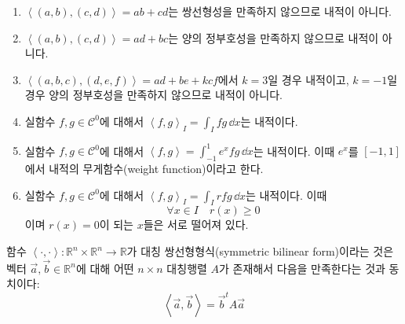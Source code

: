 \documentclass[../engineering_mathematics_lecture_note.tex]{subfiles}
\begin{document}
\begin{example}
    \leavevmode
    \begin{enumerate}
        \item $\left< (a, b), (c, d) \right> = ab + cd$는 쌍선형성을 만족하지 않으므로 내적이 아니다.
        \item $\left< (a, b), (c, d) \right> = ad + bc$는 양의 정부호성을 만족하지 않으므로 내적이 아니다.
        \item $\left< (a, b, c), (d, e, f) \right> = ad + be + kcf$에서 $k = 3$일 경우 내적이고, $k = -1$일 경우 양의 정부호성을 만족하지 않으므로 내적이 아니다.
        \item 실함수 $f, g \in \mathcal C^0$에 대해서 $\left<f, g\right>_I = \int_I f g\,\dd x$는 내적이다.
        \item 실함수 $f, g \in \mathcal C^0$에 대해서 $\left<f, g\right> = \int_{-1}^1 e^x f g\,\dd x$는 내적이다. 이때 $e^x$를 $[-1, 1]$에서 내적의 무게함수(weight function)이라고 한다.
        \item 실함수 $f, g \in \mathcal C^0$에 대해서 $\left<f, g\right>_I = \int_I r f g\,\dd x$는 내적이다. 이때
            \begin{equation*}
                \forall x \in I\quad r(x) \geq 0
            \end{equation*}
            이며 $r(x) = 0$이 되는 $x$들은 서로 떨어져 있다.
    \end{enumerate}
\end{example}

\begin{theorem} \label{thm:sym_bilinear}
    함수 $\left<\cdot, \cdot\right>: \mathbb R^n \times \mathbb R^n \rightarrow \mathbb R$가 대칭 쌍선형형식(symmetric bilinear form)이라는 것은 벡터 $\vec a, \vec b \in \mathbb R^n$에 대해 어떤 $n \times n$ 대칭행렬 $A$가 존재해서 다음을 만족한다는 것과 동치이다:
    \begin{equation*}
        \left<\vec a, \vec b\right> = \vec b^t A \vec a
    \end{equation*}
\end{theorem}
\end{document}
